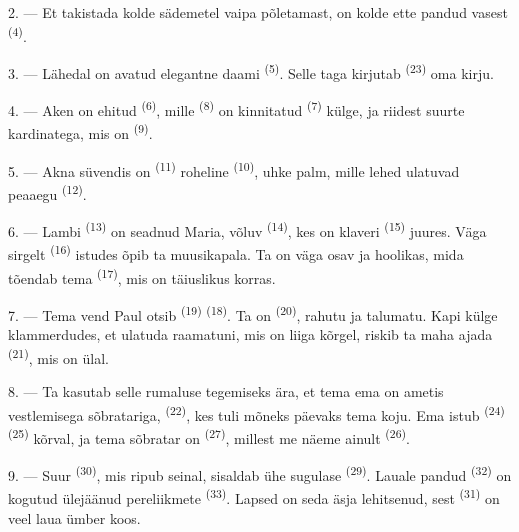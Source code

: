 2. --- Et takistada kolde sädemetel vaipa põletamast, on kolde ette pandud vasest
 \textsuperscript{(4)}.

3. --- Lähedal on avatud elegantne daami  \textsuperscript{(5)}.
Selle taga kirjutab  \textsuperscript{(23)} oma kirju.

4. --- Aken on ehitud  \textsuperscript{(6)}, mille
 \textsuperscript{(8)} on kinnitatud 
\textsuperscript{(7)} külge, ja riidest suurte kardinatega, mis on  \textsuperscript{(9)}.

5. --- Akna süvendis on  \textsuperscript{(11)} roheline
 \textsuperscript{(10)}, uhke palm, mille lehed ulatuvad peaaegu
 \textsuperscript{(12)}.

6. --- Lambi  \textsuperscript{(13)} on seadnud Maria, võluv
 \textsuperscript{(14)}, kes on klaveri \textsuperscript{(15)} juures. Väga
sirgelt  \textsuperscript{(16)} istudes õpib ta muusikapala. Ta on väga
osav ja hoolikas, mida tõendab tema  \textsuperscript{(17)}, mis on
täiuslikus korras.

\VUsaut{5.0mm}
\VUsaut{3.0mm}

7. --- Tema vend Paul otsib  \textsuperscript{(19)}
 \textsuperscript{(18)}. Ta on 
\textsuperscript{(20)}, rahutu ja talumatu. Kapi külge klammerdudes, et ulatuda
raamatuni, mis on liiga kõrgel, riskib ta maha ajada 
\textsuperscript{(21)}, mis on ülal.

8. --- Ta kasutab selle rumaluse tegemiseks ära, et tema ema on ametis vestlemisega
sõbratariga,  \textsuperscript{(22)}, kes tuli mõneks päevaks tema koju.
Ema istub  \textsuperscript{(24)} 
\textsuperscript{(25)} kõrval, ja tema sõbratar on 
\textsuperscript{(27)}, millest me näeme ainult 
\textsuperscript{(26)}.

9. --- Suur  \textsuperscript{(30)}, mis ripub seinal, sisaldab ühe
sugulase  \textsuperscript{(29)}. Lauale pandud 
\textsuperscript{(32)} on kogutud ülejäänud pereliikmete 
\textsuperscript{(33)}. Lapsed on seda äsja lehitsenud, sest 
\textsuperscript{(31)} on veel laua ümber koos.

